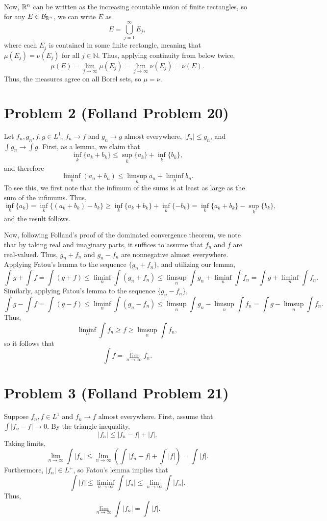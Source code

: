 \documentclass{article}
\begin{document}
Now, $\mathbb{R}^n$ can be written as the increasing countable union of finite rectangles, so for any $E\in{\cal B}_{\mathbb{R}^n}$, we can write $E$ as
\[
E=\bigcup_{j=1}^\infty E_j,
\]
where each $E_j$ is contained in some finite rectangle, meaning that $\mu(E_j)=\nu(E_j)$ for all $j\in\mathbb{N}$. Thus, applying continuity from below twice,
\[
\mu(E)=\lim_{j\to\infty}\mu(E_j)=\lim_{j\to\infty}\nu(E_j)=\nu(E).
\]
Thus, the measures agree on all Borel sets, so $\mu=\nu$.

\section{Problem 2 (Folland Problem 20)}
Let $f_n,g_n,f,g\in L^1$, $f_n\to f$ and $g_n\to g$ almost everywhere, $|f_n|\leq g_n$, and $\int g_n\to\int g$. 
First, as a lemma, we claim that 
\[
\inf_{k}\{a_k+b_k\}\leq \sup_{k}\{a_k\}+\inf_{k}\{b_k\},
\]
and therefore 
\[
\liminf_{n}(a_n+b_n)\leq \limsup_{n}a_n+\liminf_{n}b_n.
\]
To see this, we first note that the infimum of the sums is at least as large as the sum of the infimums. Thus,
\[
\inf_k\{a_k\}=\inf_k\{(a_k+b_k)-b_k\}\geq\inf_k\{a_k+b_k\}+\inf_k\{-b_k\}=\inf_k\{a_k+b_k\}-\sup_k\{b_k\},
\]
and the result follows.

Now, following Folland's proof of the dominated convergence theorem, we note that by taking real and imaginary parts, it suffices to assume that $f_n$ and $f$ are real-valued. Thus, $g_n+f_n$ and $g_n-f_n$ are nonnegative almost everywhere. Applying Fatou's lemma to the sequence $\{g_n+f_n\}$, and utilizing our lemma,
\[
\int g+\int f=\int (g+f)\leq \liminf_n\int(g_n+f_n)\leq\limsup_n\int g_n+\liminf_n\int f_n=\int g+\liminf_n\int f_n.
\]
Similarly, applying Fatou's lemma to the sequence $\{g_n-f_n\}$, 
\[
\int g-\int f=\int (g-f)\leq \liminf_n\int(g_n-f_n)\leq\limsup_n\int g_n-\limsup_n\int f_n=\int g-\limsup_n\int f_n.
\]
Thus, 
\[
\liminf_n\int f_n\geq f\geq \limsup_n\int f_n,
\]
so it follows that
\[
\int f=\lim_{n\to\infty}f_n.
\]

\section{Problem 3 (Folland Problem 21)}
Suppose $f_n,f\in L^1$ and $f_n\to f$ almost everywhere. First, assume that $\int|f_n-f|\to0$. By the triangle inequality, 
\[
|f_n|\leq |f_n-f|+|f|.
\]
Taking limits,
\[
\lim_{n\to\infty}\int |f_n|\leq \lim_{n\to\infty}\left(\int|f_n-f|+\int|f|\right)=\int|f|.
\]
Furthermore, $|f_n|\in L^+$, so Fatou's lemma implies that
\[
\int|f|\leq \liminf_{n\to\infty}\int |f_n|\leq \lim_{n\to\infty}\int |f_n|.
\]
Thus, 
\[
\lim_{n\to\infty}\int |f_n|=\int|f|.
\]
\end{document}
